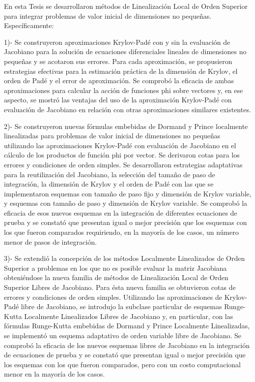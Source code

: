\begin{conclusions}

    En esta Tesis se desarrollaron métodos de Linealización Local de Orden Superior para integrar problemas de valor
    inicial de dimensiones no pequeñas. Específicamente:


    1)- Se construyeron aproximaciones Krylov-Padé con y sin la evaluación de Jacobiano para la solución de ecuaciones diferenciales lineales de dimensiones no pequeñas y se acotaron sus errores. Para cada aproximación, se propusieron estrategias efectivas para la estimación práctica de la dimensión de Krylov, el orden de Padé y el error de aproximación. Se comprobó la eficacia de ambas aproximaciones para calcular la acción de funciones phi sobre vectores y, en ese aspecto, se mostró las ventajas del uso de la aproximación Krylov-Padé con evaluación de Jacobiano en relación con otras aproximaciones similares existentes.


    2)- Se construyeron nuevas fórmulas embebidas de Dormand y Prince localmente linealizadas para problemas de valor inicial de dimensiones no pequeñas utilizando las aproximaciones Krylov-Padé con evaluación de Jacobiano en el cálculo de los productos de función phi por vector. Se derivaron cotas para los errores y condiciones de orden simples. Se  desarrollaron estrategias adaptativas para la reutilización del Jacobiano, la selección del tamaño de paso de integración, la dimensión de Krylov y el orden de Padé con las que se implementaron esquemas con tamaño de paso fijo y dimensión de Krylov variable, y esquemas con tamaño de paso y dimensión de Krylov variable. Se comprobó la eficacia de esos nuevos esquemas en la integración de diferentes ecuaciones de prueba y se constató que presentan igual o mejor precisión que los esquemas con los que fueron comparados requiriendo, en la mayoría de los casos, un número menor de pasos de integración.


    3)- Se extendió la concepción de los métodos Localmente Linealizados de Orden Superior a problemas en los que no es posible evaluar la matriz Jacobiana obteniéndose la nueva familia de métodos de  Linealización Local de Orden Superior Libres de Jacobiano. Para ésta nueva familia se obtuvieron cotas de errores y condiciones de orden simples. Utilizando las aproximaciones de Krylov-Padé libre de Jacobiano, se introdujo la subclase particular de esquemas Runge-Kutta Localmente Linealizados Libres de Jacobiano y, en particular, con las fórmulas Runge-Kutta embebidas de Dormand y  Prince Localmente Linealizadas, se implementó un esquema adaptativo de orden variable libre de Jacobiano. Se comprobó la eficacia de los nuevos esquemas libres de Jacobiano en la integración de ecuaciones de prueba y se constató que presentan igual o mejor precisión que los esquemas con los que fueron comparados, pero con un costo computacional menor en la mayoría de los casos. 




\end{conclusions}
